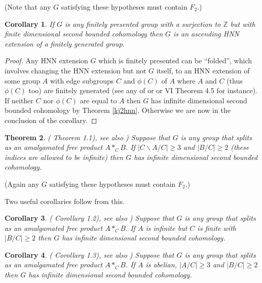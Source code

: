 \documentclass[11pt,reqno]{amsart}
\numberwithin{equation}{section}
\newcommand{\Z}{\mathbb{Z}}
\newtheorem{thm}{Theorem}[section]
\newtheorem{cor}[thm]{Corollary}
\theoremstyle{definition}
\theoremstyle{remark}
\begin{document}
  (Note that any $G$ satisfying these hypotheses must contain $F_2$.)
  \begin{cor} \label{toz}
    If $G$ is any finitely presented group with a surjection to $\Z$ but
    with finite dimensional second bounded cohomology
    then $G$ is an ascending HNN extension
    of a finitely generated group.
  \end{cor}
  \begin{proof} Any HNN extension $G$ which is finitely presented can be
    ``folded'', which involves changing the HNN extension but not $G$ itself,
    to an HNN extension of some group $A$ with edge subgroups
    $C$ and $\phi(C)$ of $A$
    where $A$ and $C$ (thus $\phi(C)$ too) are finitely generated
    (see any of \cite{bistr} or \cite{bsh} or \cite{dnwdybk} VI Theorem 4.5
    for instance). If neither $C$
    nor $\phi(C)$ are equal to $A$ then $G$ has infinite dimensional
    second bounded cohomology by Theorem \ref{kj2hnn}. Otherwise we are now in
    the conclusion of the corollary.
   \end{proof}       
\begin{thm} (\cite{kj2} Theorem 1.1), see also \cite{grig})
\label{kj2amg}
Suppose that $G$ is any group that splits as an amalgamated free
product $A*_CB$.  If $|C\backslash A/C|\geq 3$ and $|B/C|\geq 2$
(these indices are allowed to be infinite) then $G$
  has infinite dimensional second bounded cohomology.
\end{thm}
(Again any $G$ satisfying these hypotheses must contain $F_2$.)

Two useful corollaries follow from this.
\begin{cor} (\cite{kj2} Corollary 1.2), see also \cite{grig})
\label{kj2inf}
Suppose that $G$ is any group that splits as an amalgamated free
product $A*_CB$.  If $A$ is infinite but $C$ is finite with
$|B/C|\geq 2$ then $G$
  has infinite dimensional second bounded cohomology.
\end{cor}
\begin{cor} (\cite{kj2} Corollary 1.3), see also \cite{grig})
\label{kj2abl}
Suppose that $G$ is any group that splits as an amalgamated free
product $A*_CB$.  If $A$ is abelian, $|A/C|\geq 3$ and $|B/C|\geq 2$
then $G$ has infinite dimensional second bounded cohomology.
\end{cor}
\end{document}
